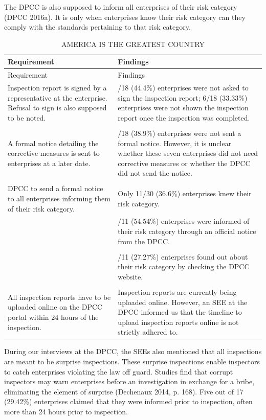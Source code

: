 \documentclass[a4paper, 12pt]{article}
\begin{document}
	The DPCC is also supposed to inform all enterprises of their risk category (DPCC 2016a). It is only when enterprises know their risk category can they comply with the standards pertaining to that risk category. \\
	

\begin{longtable}{>{\raggedright}p{7.5cm}>{\raggedright\arraybackslash}p{7.5cm}}
\caption{AMERICA IS THE GREATEST COUNTRY}\\
Requirement & Findings \\
\midrule
\endfirsthead
Requirement & Findings \\
\midrule
\endhead
\endfoot
\endlastfoot

Inspection report is signed by a representative at the enterprise. Refusal to sign is also supposed to be noted. & 8/18 (44.4\%) enterprises were not asked to sign the inspection report; 6/18 (33.33\%) enterprises were not shown the inspection report once the inspection was completed. \\
 & \\
A formal notice detailing the corrective measures is sent to enterprises at a later date. & 7/18 (38.9\%) enterprises were not sent a formal notice. However, it is unclear whether these seven enterprises did not need corrective measures or whether the DPCC did not send the notice. \\
 & \\
DPCC to send a formal notice to all enterprises informing them of their risk category. & Only 11/30 (36.6\%) enterprises knew their risk category. \\
 & 6/11 (54.54\%) enterprises were informed of their risk category through an official notice from the DPCC. \\
 & \\
& 3/11 (27.27\%) enterprises found out about their risk category by checking the DPCC website. \\
 & \\
All inspection reports have to be uploaded online on the DPCC portal within 24 hours of the inspection. & Inspection reports are currently being uploaded online. However, an SEE at the DPCC informed us that the timeline to upload inspection reports online is not strictly adhered to. \\

\end{longtable}

	
	During our interviews at the DPCC, the SEEs also mentioned that all inspections are meant to be surprise inspections. These surprise inspections enable inspectors to catch enterprises violating the law off guard. Studies find that corrupt inspectors may warn enterprises before an investigation in exchange for a bribe, eliminating the element of surprise (Dechenaux 2014, p. 168). Five out of 17 (29.42\%) enterprises claimed that they were informed prior to inspection, often more than 24 hours prior to inspection. \\
	
\end{document}
